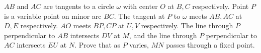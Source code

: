 $AB$ and $AC$ are tangents to a circle $\omega$ with center $O$ at $B,C$ respectively. Point $P$ is a variable point on minor arc $BC$. The tangent at $P$ to $\omega$ meets $AB,AC$ at $D,E$ respectively. $AO$ meets $BP,CP$ at $U,V$ respectively. The line through $P$ perpendicular to $AB$ intersects $DV$ at $M$, and the line through $P$ perpendicular to $AC$ intersects $EU$ at $N$. Prove that as $P$ varies, $MN$ passes through a fixed point.